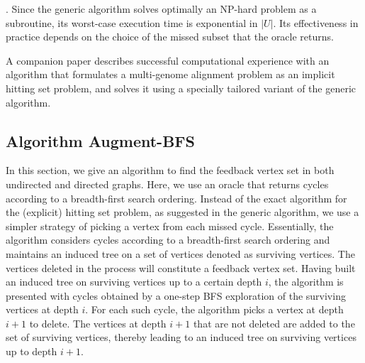 \documentclass[11pt]{article}
\begin{document}
. Since the generic algorithm solves optimally an NP-hard problem as a subroutine, its worst-case execution time is exponential in $|U|$. Its effectiveness in practice depends on the choice of the missed subset that the oracle returns.

A companion paper \cite{km} describes successful computational experience with
an algorithm that formulates a multi-genome alignment problem as an implicit
hitting set problem, and solves it using a specially tailored variant of the 
generic algorithm.

\begin{center}
\end{center}


\subsection{Algorithm Augment-BFS}
In this section, we give an algorithm to find the feedback vertex set in both undirected and directed graphs. Here, we use an oracle that returns cycles according to a breadth-first search ordering. Instead of the exact algorithm for the (explicit) hitting set problem, as suggested in the generic algorithm, we use a simpler strategy of picking a vertex from each missed cycle. Essentially, the algorithm considers cycles according to a breadth-first search ordering and maintains an induced tree on a set of vertices denoted as surviving vertices. The vertices deleted in the process will constitute a feedback vertex set. Having built an induced tree on surviving vertices up to a certain depth $i$, the algorithm is presented with cycles obtained by a one-step BFS exploration of the surviving vertices at depth $i$. For each such cycle, the algorithm picks a vertex at depth $i+1$ to delete. The vertices at depth $i+1$ that are not deleted are added to the set of surviving vertices, thereby leading to an induced tree on surviving vertices up to depth $i+1$.
\end{document}
